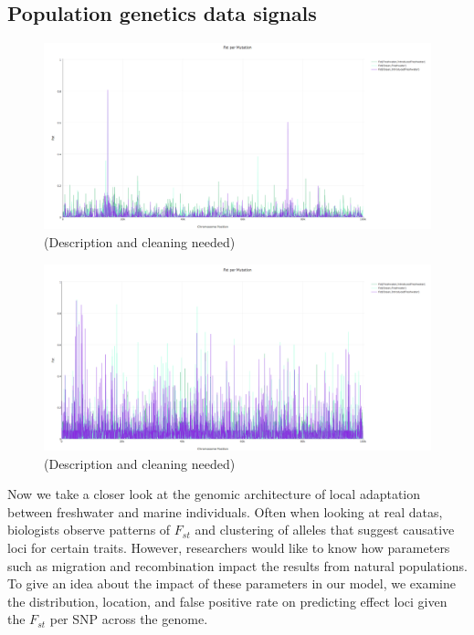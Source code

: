\documentclass{article}
\begin{document}


\subsection*{Population genetics data signals}


\begin{figure}
	\begin{center}
  		\includegraphics[width=0.7\linewidth]{plotlyPlots/FstAcross5e-3.png}
  		\caption{(Description and cleaning needed)
		}
  		\label{fig:Fst3}
	\end{center}
\end{figure}

\begin{figure}
	\begin{center}
  		\includegraphics[width=0.7\linewidth]{plotlyPlots/FstAcross5e-4.png}
  		\caption{(Description and cleaning needed)
		}
  		\label{fig:Fst2}
	\end{center}
\end{figure}

Now we take a closer look at the genomic architecture of local adaptation between freshwater and marine individuals. 
Often when looking at real datas, biologists observe patterns of $F_{st}$ and clustering of alleles that suggest causative loci for certain traits.
However, researchers would like to know how parameters such as migration and recombination impact the results from natural populations.
To give an idea about the impact of these parameters in our model, we examine the distribution, location, and false positive rate on predicting effect loci
given the $F_{st}$ per SNP across the genome. 
\end{document}
